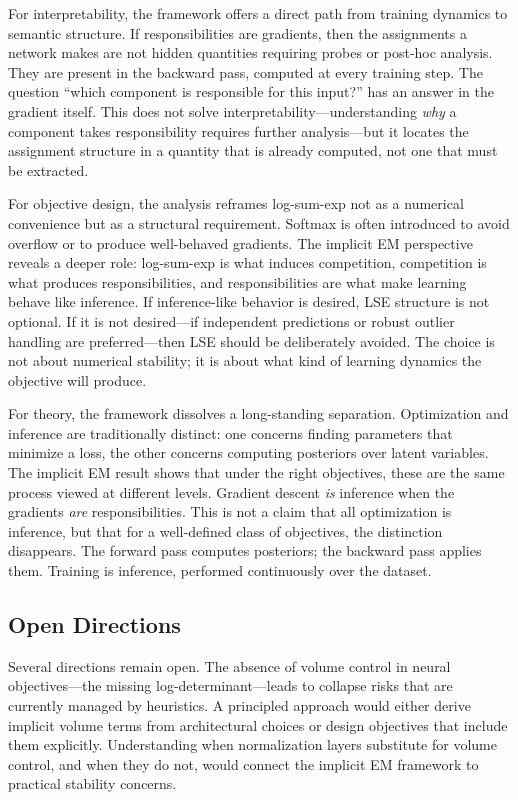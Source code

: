 For interpretability, the framework offers a direct path from training dynamics to semantic structure. If responsibilities are gradients, then the assignments a network makes are not hidden quantities requiring probes or post-hoc analysis. They are present in the backward pass, computed at every training step. The question ``which component is responsible for this input?'' has an answer in the gradient itself. This does not solve interpretability---understanding \emph{why} a component takes responsibility requires further analysis---but it locates the assignment structure in a quantity that is already computed, not one that must be extracted.

For objective design, the analysis reframes log-sum-exp not as a numerical convenience but as a structural requirement. Softmax is often introduced to avoid overflow or to produce well-behaved gradients. The implicit EM perspective reveals a deeper role: log-sum-exp is what induces competition, competition is what produces responsibilities, and responsibilities are what make learning behave like inference. If inference-like behavior is desired, LSE structure is not optional. If it is not desired---if independent predictions or robust outlier handling are preferred---then LSE should be deliberately avoided. The choice is not about numerical stability; it is about what kind of learning dynamics the objective will produce.

For theory, the framework dissolves a long-standing separation. Optimization and inference are traditionally distinct: one concerns finding parameters that minimize a loss, the other concerns computing posteriors over latent variables. The implicit EM result shows that under the right objectives, these are the same process viewed at different levels. Gradient descent \emph{is} inference when the gradients \emph{are} responsibilities. This is not a claim that all optimization is inference, but that for a well-defined class of objectives, the distinction disappears. The forward pass computes posteriors; the backward pass applies them. Training is inference, performed continuously over the dataset.

\subsection{Open Directions}

Several directions remain open. The absence of volume control in neural objectives---the missing log-determinant---leads to collapse risks that are currently managed by heuristics. A principled approach would either derive implicit volume terms from architectural choices or design objectives that include them explicitly. Understanding when normalization layers substitute for volume control, and when they do not, would connect the implicit EM framework to practical stability concerns.

